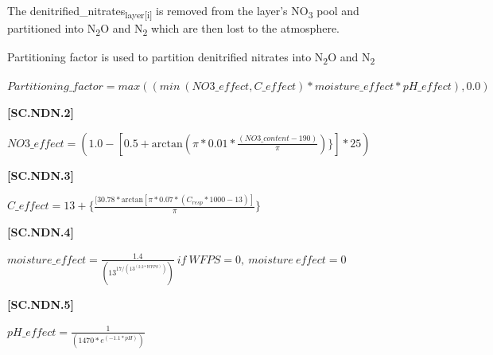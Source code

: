 The denitrified\_nitrates\textsubscript{layer[i]} is removed from the layer’s NO\textsubscript{3} pool and partitioned into N\textsubscript{2}O and N\textsubscript{2} which are then lost to the atmosphere. 
\vspace{0.2cm}

Partitioning factor is used to partition denitrified nitrates into N\textsubscript{2}O and N\textsubscript{2}
\vspace{0.5cm}
            
    \begin{center}
\(Partitioning\_factor = max((min\ (NO3\_effect, C\_effect) * moisture\_effect *pH\_effect), 0.0)\)
    \end{center}
    \vspace{0.5cm}

            {\raggedleft \textbf{[SC.NDN.2]}\par}
            \vspace{0.5cm}
            
   \begin{center}
\(NO3\_effect=(1.0-[0.5+\text{arctan}(\pi*0.01*\frac{(NO3\_content-190)}{\pi})\}] *25)\)
  \end{center}
    \vspace{0.5cm}

            {\raggedleft \textbf{[SC.NDN.3]}\par}
            \vspace{0.5cm}

   \begin{center}
\(C\_effect=13 +\{\frac{[30.78*\text{arctan}[\pi*0.07*(C_{resp}*1000-13)]}{\pi} \}\)
  \end{center}
    \vspace{0.5cm}

            {\raggedleft \textbf{[SC.NDN.4]}\par}
            \vspace{0.5cm}
            

   \begin{center}
\(moisture\_effect=\frac{1.4}{(13^{17/(13^{(2.2*WFPS)} )} )}\ if\ WFPS=0,\ moisture\ effect = 0 \)
  \end{center}
    \vspace{0.5cm}

            {\raggedleft \textbf{[SC.NDN.5]}\par}
            \vspace{0.5cm}
            

   \begin{center}
\(pH\_effect=\frac{1}{(1470*e^{(-1.1*pH)} )} \)
    \end{center}
    \vspace{0.5cm}

